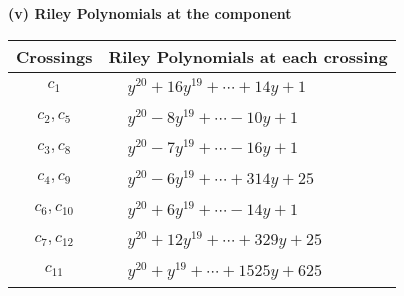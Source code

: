 \documentclass[1p]{elsarticle_modified}
\theoremstyle{definition}
\begin{document}
\newpage\renewcommand{\arraystretch}{1}
\flushleft \textbf{(v) Riley Polynomials at the component}\newline \\
\begin{tabular}{m{50pt}|m{274pt}}
Crossings & \hspace{64pt}Riley Polynomials at each crossing \\
\hline $$\begin{aligned}c_{1}\end{aligned}$$&$\begin{aligned}
&y^{20}+16 y^{19}+\cdots+14 y+1
\end{aligned}$\\
\hline $$\begin{aligned}c_{2},c_{5}\end{aligned}$$&$\begin{aligned}
&y^{20}-8 y^{19}+\cdots-10 y+1
\end{aligned}$\\
\hline $$\begin{aligned}c_{3},c_{8}\end{aligned}$$&$\begin{aligned}
&y^{20}-7 y^{19}+\cdots-16 y+1
\end{aligned}$\\
\hline $$\begin{aligned}c_{4},c_{9}\end{aligned}$$&$\begin{aligned}
&y^{20}-6 y^{19}+\cdots+314 y+25
\end{aligned}$\\
\hline $$\begin{aligned}c_{6},c_{10}\end{aligned}$$&$\begin{aligned}
&y^{20}+6 y^{19}+\cdots-14 y+1
\end{aligned}$\\
\hline $$\begin{aligned}c_{7},c_{12}\end{aligned}$$&$\begin{aligned}
&y^{20}+12 y^{19}+\cdots+329 y+25
\end{aligned}$\\
\hline $$\begin{aligned}c_{11}\end{aligned}$$&$\begin{aligned}
&y^{20}+y^{19}+\cdots+1525 y+625
\end{aligned}$\\
\hline
\end{tabular}\\~\\
\end{document}
